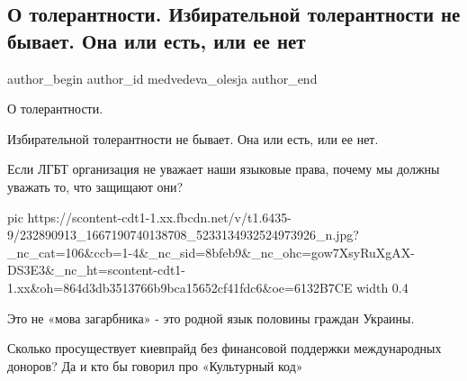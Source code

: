  
 
 
 
 
 
\subsection{О толерантности. Избирательной толерантности не бывает. Она или есть, или ее нет}
\label{sec:05_08_2021.fb.medvedeva_olesja.1.tolerantnost}
 
\ifcmt
 author_begin
   author_id medvedeva_olesja
 author_end
\fi

О толерантности. 

Избирательной толерантности не бывает. Она или есть, или ее нет. 

Если ЛГБТ организация не уважает наши языковые права, почему мы должны уважать
то, что защищают они? 

\ifcmt
  pic https://scontent-cdt1-1.xx.fbcdn.net/v/t1.6435-9/232890913_1667190740138708_5233134932524973926_n.jpg?_nc_cat=106&ccb=1-4&_nc_sid=8bfeb9&_nc_ohc=gow7XsyRuXgAX-DS3E3&_nc_ht=scontent-cdt1-1.xx&oh=864d3db3513766b9bca15652cf41fdc6&oe=6132B7CE
  width 0.4
\fi

Это не «мова загарбника» - это родной язык половины граждан Украины. 

Сколько просуществует киевпрайд без финансовой поддержки международных доноров?
Да и кто бы говорил про «Культурный код»

